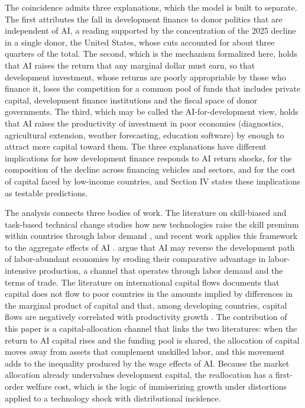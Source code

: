 \documentclass[AER]{AEA}
\begin{document}
The coincidence admits three explanations, which the model is built to separate. The first attributes the fall in development finance to donor politics that are independent of AI, a reading supported by the concentration of the 2025 decline in a single donor, the United States, whose cuts accounted for about three quarters of the total. The second, which is the mechanism formalized here, holds that AI raises the return that any marginal dollar must earn, so that development investment, whose returns are poorly appropriable by those who finance it, loses the competition for a common pool of funds that includes private capital, development finance institutions and the fiscal space of donor governments. The third, which may be called the AI-for-development view, holds that AI raises the productivity of investment in poor economies (diagnostics, agricultural extension, weather forecasting, education software) by enough to attract more capital toward them. The three explanations have different implications for how development finance responds to AI return shocks, for the composition of the decline across financing vehicles and sectors, and for the cost of capital faced by low-income countries, and Section IV states these implications as testable predictions.

The analysis connects three bodies of work. The literature on skill-biased and task-based technical change studies how new technologies raise the skill premium within countries through labor demand \citep{AcemogluAutor2011,AcemogluRestrepo2018}, and recent work applies this framework to the aggregate effects of AI \citep{Acemoglu2025}. \citet{KorinekStiglitz2021} argue that AI may reverse the development path of labor-abundant economies by eroding their comparative advantage in labor-intensive production, a channel that operates through labor demand and the terms of trade. The literature on international capital flows documents that capital does not flow to poor countries in the amounts implied by differences in the marginal product of capital \citep{Lucas1990,CaselliFeyrer2007} and that, among developing countries, capital flows are negatively correlated with productivity growth \citep{GourinchasJeanne2013}. The contribution of this paper is a capital-allocation channel that links the two literatures: when the return to AI capital rises and the funding pool is shared, the allocation of capital moves away from assets that complement unskilled labor, and this movement adds to the inequality produced by the wage effects of AI. Because the market allocation already undervalues development capital, the reallocation has a first-order welfare cost, which is the logic of immiserizing growth under distortions \citep{Bhagwati1968} applied to a technology shock with distributional incidence.
\end{document}
